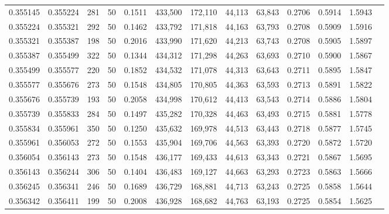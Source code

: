 \begin{tabular}{rrrrrrrrrrrrr}
0.355145 & 0.355224 &   281 &  50 &                                     0.1511 & 433,500 & 172,110 &  44,113 &  63,843 & 0.2706 & 0.5914 & 1.5943 \\
0.355224 & 0.355321 &   292 &  50 &                                     0.1462 & 433,792 & 171,818 &  44,163 &  63,793 & 0.2708 & 0.5909 & 1.5916 \\
0.355321 & 0.355387 &   198 &  50 &                                     0.2016 & 433,990 & 171,620 &  44,213 &  63,743 & 0.2708 & 0.5905 & 1.5897 \\
0.355387 & 0.355499 &   322 &  50 &                                     0.1344 & 434,312 & 171,298 &  44,263 &  63,693 & 0.2710 & 0.5900 & 1.5867 \\
0.355499 & 0.355577 &   220 &  50 &                                     0.1852 & 434,532 & 171,078 &  44,313 &  63,643 & 0.2711 & 0.5895 & 1.5847 \\
0.355577 & 0.355676 &   273 &  50 &                                     0.1548 & 434,805 & 170,805 &  44,363 &  63,593 & 0.2713 & 0.5891 & 1.5822 \\
0.355676 & 0.355739 &   193 &  50 &                                     0.2058 & 434,998 & 170,612 &  44,413 &  63,543 & 0.2714 & 0.5886 & 1.5804 \\
0.355739 & 0.355833 &   284 &  50 &                                     0.1497 & 435,282 & 170,328 &  44,463 &  63,493 & 0.2715 & 0.5881 & 1.5778 \\
0.355834 & 0.355961 &   350 &  50 &                                     0.1250 & 435,632 & 169,978 &  44,513 &  63,443 & 0.2718 & 0.5877 & 1.5745 \\
0.355961 & 0.356053 &   272 &  50 &                                     0.1553 & 435,904 & 169,706 &  44,563 &  63,393 & 0.2720 & 0.5872 & 1.5720 \\
0.356054 & 0.356143 &   273 &  50 &                                     0.1548 & 436,177 & 169,433 &  44,613 &  63,343 & 0.2721 & 0.5867 & 1.5695 \\
0.356143 & 0.356244 &   306 &  50 &                                     0.1404 & 436,483 & 169,127 &  44,663 &  63,293 & 0.2723 & 0.5863 & 1.5666 \\
0.356245 & 0.356341 &   246 &  50 &                                     0.1689 & 436,729 & 168,881 &  44,713 &  63,243 & 0.2725 & 0.5858 & 1.5644 \\
0.356342 & 0.356411 &   199 &  50 &                                     0.2008 & 436,928 & 168,682 &  44,763 &  63,193 & 0.2725 & 0.5854 & 1.5625 \\

\end{tabular}
